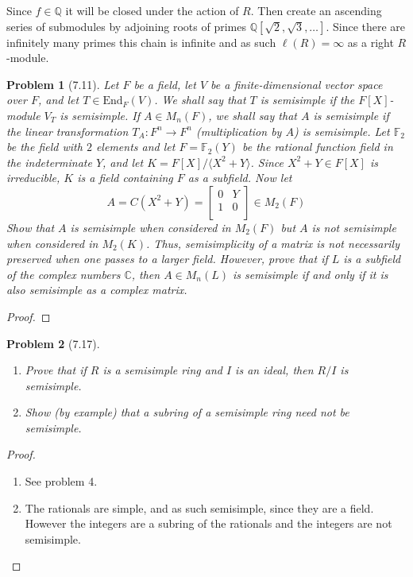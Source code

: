 \documentclass[10pt]{article}
\newcommand{\sk}{\vskip 10mm}
\newcommand{\bb}[1]{\mathbb{#1}}
\theoremstyle{plain}
\newtheorem{problem}{Problem}
\theoremstyle{remark}
\begin{document}
Since $f\in\bb{Q}$ it will be closed under the action of $R$.
Then create an ascending series of submodules by
adjoining roots of primes $\bb{Q}[\sqrt{2},\sqrt{3},\ldots]$.
Since there are infinitely many primes this chain is infinite
and as such $\ell(R)=\infty$ as a right $R$-module.

\sk

\begin{problem}[7.11]
  Let $F$ be a field, let $V$ be a finite-dimensional vector space over $F$,
  and let $T\in \text{End}_F(V)$. We shall say that $T$ is semisimple if the
  $F[X]$-module $V_T$ is semisimple. If $A\in M_n(F)$, we shall say that $A$
  is semisimple if the linear transformation $T_A: F^n\rightarrow F^n$
  (multiplication by $A$) is semisimple. Let $\bb{F}_2$ be the field with
  $2$ elements and let $F=\bb{F}_2(Y)$ be the rational function field in
  the indeterminate $Y$, and let $K=F[X]/\langle X^2+Y\rangle$. Since
  $X^2+Y\in F[X]$ is irreducible, $K$ is a field containing
  $F$ as a subfield. Now let
  \[
    A=C(X^2+Y)=
    \left[
      \begin{array}{cc}
        0&Y\\
        1&0\\
      \end{array}
    \right]
    \in M_2(F)
  \]
  Show that $A$ is semisimple when considered in $M_2(F)$ but $A$ is not
  semisimple when considered in $M_2(K)$. Thus, semisimplicity of a matrix
  is not necessarily preserved when one passes to a larger field. However,
  prove that if $L$ is a subfield of the complex numbers $\bb{C}$, then
  $A\in M_n(L)$ is semisimple if and only if it is also semisimple as a complex
  matrix.
\end{problem}

\begin{proof}
  
\end{proof}

\sk

\begin{problem}[7.17]
  \begin{enumerate}
  \item[(a)] Prove that if $R$ is a semisimple ring and $I$ is an ideal,
    then $R/I$ is semisimple.
  \item[(b)] Show (by example) that a subring of a semisimple ring need
    not be semisimple.
  \end{enumerate}
\end{problem}

\begin{proof}
  \begin{enumerate}
  \item[(a)] See problem 4.
  \item[(b)] The rationals are simple, and as such semisimple, since they are
    a field. However the integers are a subring of the rationals and
    the integers are not semisimple.
  \end{enumerate}
\end{proof}

\end{document}
